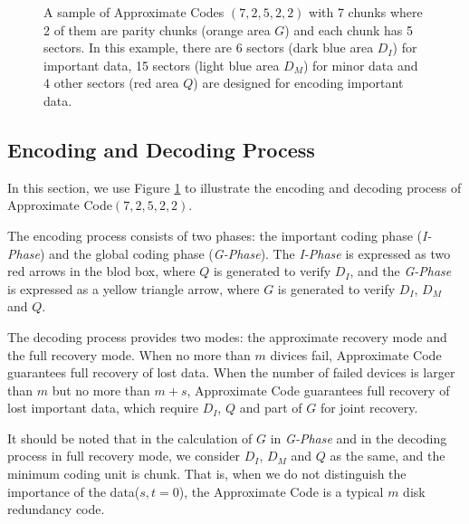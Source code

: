 \documentclass[sigconf]{acmart}
\begin{document}
\begin{figure}[h]
\centering
{}
\caption{A sample of Approximate Codes $(7,2,5,2,2)$ with 7 chunks where 2 of them are parity chunks (orange area $G$) and each chunk has 5 sectors. In this example, there are 6 sectors (dark blue area $D_I$) for important data, 15 sectors (light blue area $D_M$) for minor data and 4 other sectors (red area $Q$) are designed for encoding important data.}
\label{apcode-72522-v2}
\end{figure}

\subsection{Encoding and Decoding Process}
In this section, we use Figure \ref{apcode-72522-v2} to illustrate the encoding and decoding process of Approximate Code$(7,2,5,2,2)$.

The encoding process consists of two phases: the important coding phase (\emph{I-Phase}) and the global coding phase (\emph{G-Phase}). 
The \emph{I-Phase} is expressed as two red arrows in the blod box, where $Q$ is generated to verify $D_I$, and
the \emph{G-Phase} is expressed as a yellow triangle arrow, where $G$ is generated to verify $D_I$, $D_M$ and $Q$.

The decoding process provides two modes: the approximate recovery mode and the full recovery mode.
When no more than $m$ divices fail, Approximate Code guarantees full recovery of lost data.
When the number of failed devices is larger than $m$ but no more than $m+s$, Approximate Code guarantees full recovery of lost important data, which require $D_I$, $Q$ and part of $G$ for joint recovery.

It should be noted that in the calculation of $G$ in \emph{G-Phase} and in the decoding process in full recovery mode, we consider $D_I$, $D_M$ and $Q$ as the same, and the minimum coding unit is chunk. That is, when we do not distinguish the importance of the data($s,t = 0$), the Approximate Code is a typical $m$ disk redundancy code.
\end{document}
